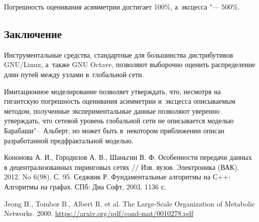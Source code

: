 \documentclass[10pt, a5paper]{article}
\begin{document}
Погрешность оценивания асимметрии достигает 100\%, а~эксцесса "--- 500\%.


\subsection*{Заключение}

Инструментальные средства, стандартные для большинства дистрибутивов GNU/Linux, а~также GNU Octave, позволяют выборочно оценить распределение длин путей между узлами в~глобальной сети.

Имитационное моделирование позволяет утверждать, что, несмотря на гигантскую погрешность оценивания асимметрии и~эксцесса описываемым методом, полученные экспериментальные данные позволяют уверенно утверждать, что сетевой уровень глобальной сети не описывается моделью Барабаши"--~Альберт, но может быть в~некотором приближении описан разработанной  предфрактальной моделью.

 
\begin{thebibliography}{9}
 {Кононова А. И., Городилов А. В., Шаньгин В. Ф. Особенности передачи
данных в децентрализованных пиринговых сетях // Изв. вузов. Электроника
(ВАК). 2012. No 6(98). С. 95.
}
 {Седжвик Р. Фундаментальные алгоритмы на С++: Алгоритмы на графах.
СПб: Диа Софт, 2003. 1136 с.
}

 {Jeong H., Tombor B., Albert R. et al. The Large-Scale Organization of Metabolic Networks. 2000. \url{https://arxiv.org/pdf/cond-mat/0010278.pdf}
}

\end{thebibliography}
\end{document}
